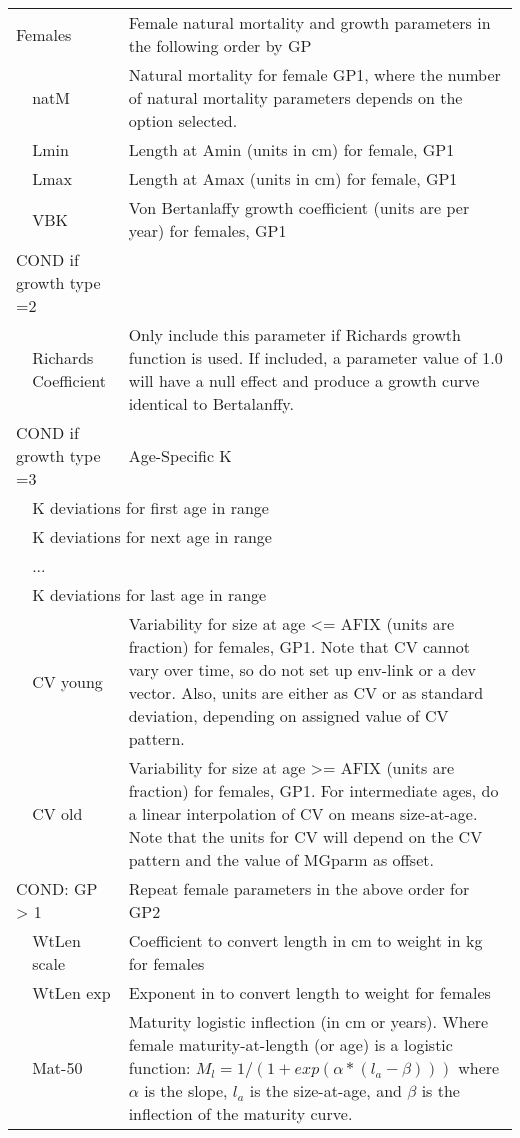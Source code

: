 \begin{center}
\begin{longtable}{p{1cm} p{2.5cm} p{10cm}}
		\multicolumn{2}{l}{Females} & Female natural mortality and growth parameters in the following order by GP\\
		& natM & Natural mortality for female GP1, where the number of natural mortality parameters depends on the option selected.\\
		& Lmin & Length at Amin (units in cm) for female, GP1 \\
		& Lmax & Length at Amax (units in cm) for female, GP1 \\
		& VBK & Von Bertanlaffy growth coefficient (units are per year) for females, GP1\\
		\hline
		\multicolumn{2}{l}{COND if growth type =2 } & \\
		& Richards Coefficient & Only include this parameter if Richards growth function is used.  If included, a parameter value of 1.0 will have a null effect and produce a growth curve identical to Bertalanffy.\\
		\multicolumn{2}{l}{COND if growth type =3 } & Age-Specific K \\
		& \multicolumn{2}{l}{K deviations for first age in range}\\
		& \multicolumn{2}{l}{K deviations for next age in range}\\
		& ... & \\
		& \multicolumn{2}{l}{K deviations for last age in range}\\
		\hline
	    & CV young & Variability for size at age <= AFIX (units are fraction) for females, GP1.  Note that CV cannot vary over time, so do not set up env-link or a dev vector.  Also, units are either as CV or as standard deviation, depending on assigned value of CV pattern.\\
		& CV old & Variability for size at age >= AFIX (units are fraction) for females, GP1. For intermediate ages, do a linear interpolation of CV on means size-at-age.  Note that the units for CV will depend on the CV pattern and the value of MGparm as offset.\\
		\hline
		\multicolumn{2}{l}{COND: GP > 1} & Repeat female parameters in the above order for GP2\\
		\hline
		& WtLen scale & Coefficient to convert length in cm to weight in kg for females\\
		& WtLen exp & Exponent in to convert length to weight for females\\
		& Mat-50 & Maturity logistic inflection (in cm or years).  Where female maturity-at-length (or age) is a logistic function: $M_{l} = 1/(1+exp(\alpha*(l_{a} - \beta)))$ where $\alpha$ is the slope, $l_{a}$ is the size-at-age, and $\beta$ is the inflection of the maturity curve. \\ 

\end{longtable}
\end{center}
